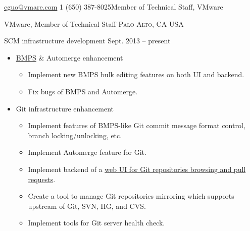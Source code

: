 \documentclass[10pt,letterpaper]{article}
\begin{document}
 



\noindent\href{mailto:cguo@vmware.com}{cguo@vmare.com}\bull
\textsmaller{+}1 (650) 387-8025\bull Member of Technical Staff, VMware

\spacedhrule{0.9em}{-0.4em} %



\headedsection
{VMware, Member of Technical Staff}
{\textsc{Palo Alto, CA USA}} {
\headedsubsection 
{SCM infrastructure development} {Sept. 2013 -- present}
{
    \begin{itemize}
        \item \href{http://bmps.eng.vmware.com}{BMPS} \& Automerge enhancement
            \begin{itemize}
                \item Implement new BMPS bulk editing features on both UI and
                    backend.
                \item Fix bugs of BMPS and Automerge.
            \end{itemize}
        \item Git infrastructure enhancement
            \begin{itemize}
                \item Implement features of BMPS-like Git commit message format
                    control, branch locking/unlocking, etc.
                \item Implement Automerge feature for Git.
                \item Implement backend of a 
                    \href{http://git.eng.vmware.com}{web UI for Git
                    repositories browsing and pull requests}.
                \item Create a tool to manage Git repositories mirroring which
                    supports upstream of Git, SVN, HG, and CVS.
                \item Implement tools for Git server health check.
            \end{itemize}

    \end{itemize}
}
}
\end{document}
